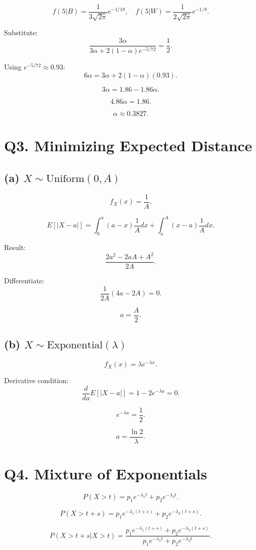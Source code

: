 \documentclass[12pt]{article}
\begin{document}
\[
f(5|B)=\frac{1}{3\sqrt{2\pi}} e^{-1/18}, \quad
f(5|W)=\frac{1}{2\sqrt{2\pi}} e^{-1/8}.
\]

Substitute:
\[
\frac{3\alpha}{3\alpha+2(1-\alpha)e^{-5/72}}=\frac12.
\]

Using $e^{-5/72}\approx0.93$:
\[
6\alpha=3\alpha+2(1-\alpha)(0.93).
\]

\[
3\alpha=1.86-1.86\alpha.
\]

\[
4.86\alpha=1.86.
\]

\[
\alpha\approx0.3827.
\]

\section*{Q3. Minimizing Expected Distance}

\subsection*{(a) $X \sim \text{Uniform}(0,A)$}

\[
f_X(x)=\frac1A.
\]

\[
E[|X-a|]=\int_0^a (a-x)\frac1A dx + \int_a^A (x-a)\frac1A dx.
\]

Result:
\[
\frac{2a^2-2aA+A^2}{2A}.
\]

Differentiate:
\[
\frac{1}{2A}(4a-2A)=0.
\]

\[
a=\frac{A}{2}.
\]

\subsection*{(b) $X \sim \text{Exponential}(\lambda)$}

\[
f_X(x)=\lambda e^{-\lambda x}.
\]

Derivative condition:
\[
\frac{d}{da}E[|X-a|]=1-2e^{-\lambda a}=0.
\]

\[
e^{-\lambda a}=\frac12.
\]

\[
a=\frac{\ln 2}{\lambda}.
\]

\section*{Q4. Mixture of Exponentials}

\[
P(X>t)=p_1 e^{-\lambda_1 t}+p_2 e^{-\lambda_2 t}.
\]

\[
P(X>t+s)=p_1 e^{-\lambda_1(t+s)}+p_2 e^{-\lambda_2(t+s)}.
\]

\[
P(X>t+s|X>t)=
\frac{p_1 e^{-\lambda_1(t+s)}+p_2 e^{-\lambda_2(t+s)}}
{p_1 e^{-\lambda_1 t}+p_2 e^{-\lambda_2 t}}.
\]
\end{document}
